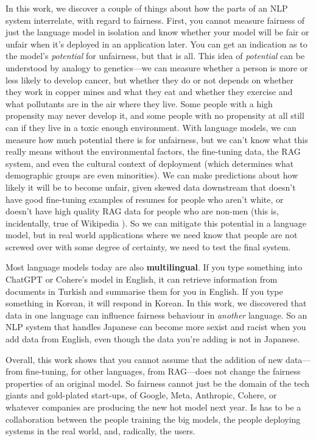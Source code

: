 \documentclass[phd,ilcc,oneside,leftchapter,parskip]{infthesis}
\begin{document}
\begin{preliminary}
\begin{laysummary}
In this work, we discover a couple of things about how the parts of an NLP system interrelate, with regard to fairness. First, you cannot measure fairness of just the language model in isolation and know whether your model will be fair or unfair when it's deployed in an application later. You can get an indication as to the model's \textit{potential} for unfairness, but that is all. This idea of \textit{potential} can be understood by analogy to genetics---we can measure whether a person is more or less likely to develop cancer, but whether they do or not depends on whether they work in copper mines and what they eat and whether they exercise and what pollutants are in the air where they live. Some people with a high propensity may never develop it, and some people with no propensity at all still can if they live in a toxic enough environment. With language models, we can measure how much potential there is for unfairness, but we can't know what this really means without the environmental factors, the fine-tuning data, the RAG system, and even the cultural context of deployment (which determines what demographic groups are even minorities). We can make predictions about how likely it will be to become unfair, given skewed data downstream that doesn't have good fine-tuning examples of resumes for people who aren't white, or doesn't have high quality RAG data for people who are non-men (this is, incidentally, true of Wikipedia \citep{sun-peng-2021-men}). So we can mitigate this potential in a language model, but in real world applications where we need know that people are not screwed over with some degree of certainty, we need to test the final system.

Most language models today are also \textbf{multilingual}. If you type something into ChatGPT or Cohere's model in English, it can retrieve information from documents in Turkish and summarise them for you in English. If you type something in Korean, it will respond in Korean. In this work, we discovered that data in one language can influence fairness behaviour in \textit{another} language. So an NLP system that handles Japanese can become more sexist and racist when you add data from English, even though the data you're adding is not in Japanese. 

Overall, this work shows that you cannot assume that the addition of new data---from fine-tuning, for other languages, from RAG---does not change the fairness properties of an original model. So fairness cannot just be the domain of the tech giants and gold-plated start-ups, of Google, Meta, Anthropic, Cohere, or whatever companies are producing the new hot model next year. Is has to be a collaboration between the people training the big models, the people deploying systems in the real world, and, radically, the users. 


\end{laysummary}
\end{preliminary}
\end{document}
